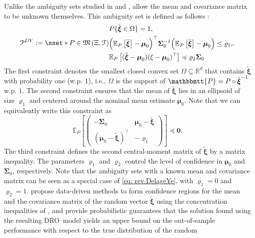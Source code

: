 \documentclass[final,onefignum,onetabnum]{class}
\newcommand{\ee}[2]{\mathbb{E}_{#1} \left[ #2 \right]}
\newcommand{\bs}[1]{\boldsymbol{#1}} %
\newcommand{\Bs}[1]{\mathbb{#1}} %
\newcommand{\Ts}[1]{\mathbbmtt{#1}} %
\newcommand{\Cs}[1]{\mathcal{#1}} %
\newcommand{\Fs}[1]{\mathfrak{#1}} %
\newcommand{\txi}{\tilde{\bs{\xi}}}
\newcommand{\measurespace}{\left( \Xi, \Cs{F} \right)}
\newcommand{\dro}{DRO}
\begin{document}
Unlike the ambiguity sets studied in \citet{scarf1958} and \citet{gallego1993}, \citet{delage2010} allow the mean and covariance matrix to be unknown themselves. This ambiguity set is defined as follows \citep{delage2010}: 
\begin{equation}
\label{eq: rev.DelageYe}
\Cs{P}^{DY}:=\sset*{P \in\Fs{M}\measurespace}{ 
\begin{aligned}  
& P\{\txi \in \Omega\}=1,\\
& \Big(\ee{P}{\txi} - \bs{\mu}_{0}\Big)^{\top}\bs{\Sigma}_{0}^{-1}\Big(\ee{P}{\txi} - \bs{\mu}_{0}\Big) \le \varrho_{1},\\  	
& \ee{P}{(\txi-\bs{\mu}_{0})(\xi-\bs{\mu}_{0})^{\top}} \preccurlyeq \varrho_{2} \bs{\Sigma}_{0}  
\end{aligned}  
}.
\end{equation} 
The first constraint denotes the smallest closed convex set $\Omega \subseteq \Bs{R}^{d}$ that contains $\txi$ with probability one (w.p. $1$), i.e., $\Omega$ is the support of $\Ts{P}=P \circ \txi^{-1}$ w.p. $1$. 
The second constraint  ensures that the mean of $\txi$ lies in an ellipsoid of size $\varrho_{1}$ and centered around the nominal mean estimate $\bs{\mu}_{0}$. Note that we can equivalently write this constraint as 
$$  \ee{P}{\begin{pmatrix}
    -\bs{\Sigma}_{0}       & \bs{\mu}_{0} -\txi \\
    (\bs{\mu}_{0} -\txi)^{\top} & -\varrho_{1}
\end{pmatrix}} \preccurlyeq \bs{0}.$$
The third constraint defines the  second central-moment matrix of $\txi$ %
by a matrix inequality. The parameters $\varrho_{1}$ and $\varrho_{2}$ control the level of confidence in    $\bs{\mu}_{0}$ and  $ \bs{\Sigma}_{0}$, respectively. 
Note that the ambiguity sets with a known mean and covariance matrix  can be seen as a special case of \eqref{eq: rev.DelageYe}, with $\varrho_{1}=0$ and $\varrho_{2}=1$. 
\citet{delage2010}   propose data-driven methods to form confidence regions for the mean and the covariance matrix of the random vector $\txi$ using the concentration inequalities of \citet{mcdiarmid1998}, and provide probabilistic guarantees
that the solution found using the resulting \dro\ model 
yields an upper bound on the out-of-sample performance with respect to the true distribution of the random
\end{document}
